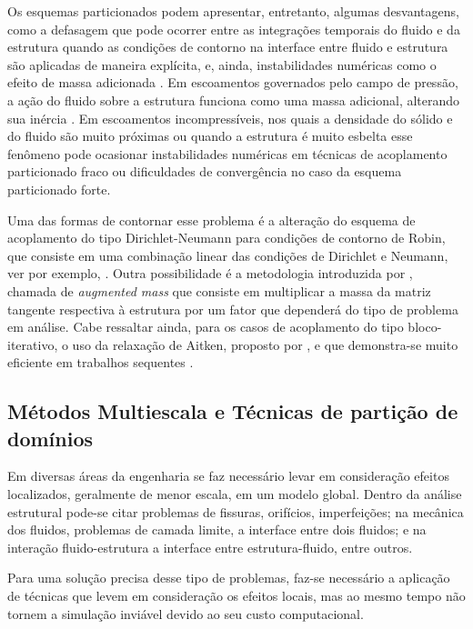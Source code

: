 \documentclass[tese_patricia.tex]{subfiles}
\begin{document}
Os esquemas particionados podem apresentar, entretanto, algumas desvantagens, como a defasagem que pode ocorrer entre as integrações temporais do fluido e da estrutura quando as condições de contorno na interface entre fluido e estrutura são aplicadas de maneira explícita, e, ainda, instabilidades numéricas como o efeito de massa adicionada \cite{FelippaPF:2001}. Em escoamentos governados pelo campo de pressão, a ação do fluido sobre a estrutura funciona como uma massa adicional, alterando sua inércia \cite{TallecM:2001}. Em escoamentos incompressíveis, nos quais a densidade do sólido e do fluido são muito próximas ou quando a estrutura é muito esbelta esse fenômeno pode ocasionar instabilidades numéricas em técnicas de acoplamento particionado fraco ou dificuldades de convergência no caso da esquema particionado forte. 

Uma das formas de contornar esse problema é a alteração do esquema de acoplamento do tipo Dirichlet-Neumann para condições de contorno de Robin, que consiste em uma combinação linear das condições de Dirichlet e Neumann, ver por exemplo, . Outra possibilidade é a metodologia introduzida por , chamada de \textit{augmented mass} que consiste em multiplicar a massa da matriz tangente respectiva à estrutura por um fator que dependerá do tipo de problema em análise. Cabe ressaltar ainda, para os casos de acoplamento do tipo bloco-iterativo, o uso da relaxação de Aitken, proposto por , e que demonstra-se muito eficiente em trabalhos sequentes \cite{KuttlerW:2008,FernandesCS:2019}.

\subsection{Métodos Multiescala e Técnicas de partição de domínios}
\label{arlequinsection}

Em diversas áreas da engenharia se faz necessário levar em consideração efeitos localizados, geralmente de menor escala, em um modelo global. Dentro da análise estrutural pode-se citar problemas de fissuras, orifícios, imperfeições; na mecânica dos fluidos, problemas de camada limite, a interface entre dois fluidos; e na interação fluido-estrutura a interface entre estrutura-fluido, entre outros.

Para uma solução precisa desse tipo de problemas, faz-se necessário a aplicação de técnicas que levem em consideração os efeitos locais, mas ao mesmo tempo não tornem a simulação inviável devido ao seu custo computacional.
\end{document}
